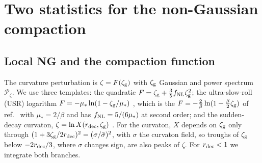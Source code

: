 \documentclass[a4paper,11pt]{article}
\newcommand{\zg}{\zeta_{\rm g}}
\newcommand{\fnl}{f_{\rm NL}}
\newcommand{\Pz}{\mathcal{P}_\zeta}
\begin{document}
\section{Two statistics for the non-Gaussian compaction}\label{sec:stats}

\subsection{Local NG and the compaction function}

The curvature perturbation is $\zeta=F(\zg)$ with $\zg$ Gaussian and power spectrum $\Pz$. We use
three templates: the quadratic $F=\zg+\frac35\fnl\zg^2$; the ultra-slow-roll (USR) logarithm
$F=-\mu_*\ln(1-\zg/\mu_*)$ \cite{AGM19}, which is the $F=-\frac2\beta\ln(1-\frac\beta2\zg)$ of
ref.~\cite{FIVT23} with $\mu_*=2/\beta$ and has $\fnl=5/(6\mu_*)$ at second order; and the
sudden-decay curvaton, $\zeta=\ln X(r_{\rm dec},\zg)$ \cite{SVW06,Ferrante}. For the curvaton, $X$
depends on $\zg$ only through $(1+3\zg/2r_{\rm dec})^2=(\sigma/\bar\sigma)^2$, with $\sigma$ the
curvaton field, so troughs of $\zg$ below $-2r_{\rm dec}/3$, where $\sigma$ changes sign, are also
peaks of $\zeta$. For $r_{\rm dec}<1$ we integrate both branches.
\end{document}
